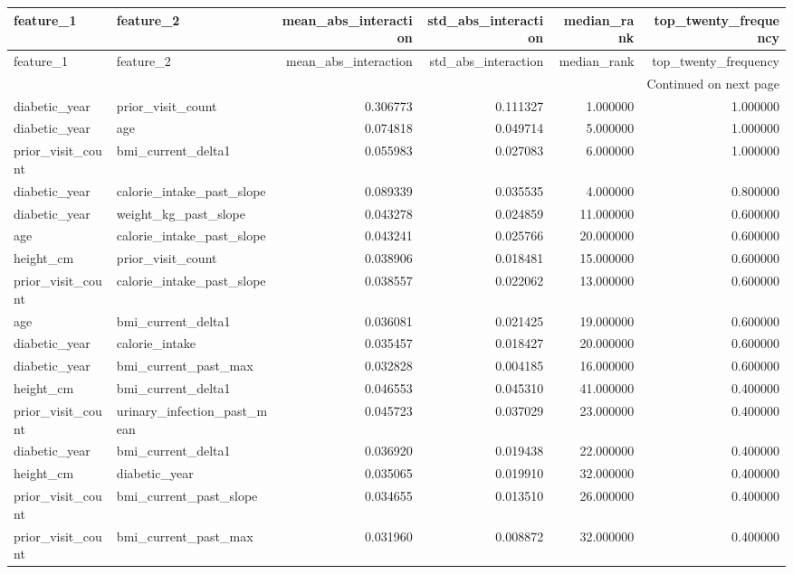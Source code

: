\begin{longtable}{llrrrr}
\toprule
feature\_1 & feature\_2 & mean\_abs\_interaction & std\_abs\_interaction & median\_rank & top\_twenty\_frequency \\
\midrule
\endfirsthead
\toprule
feature\_1 & feature\_2 & mean\_abs\_interaction & std\_abs\_interaction & median\_rank & top\_twenty\_frequency \\
\midrule
\endhead
\midrule
\multicolumn{6}{r}{Continued on next page} \\
\midrule
\endfoot
\bottomrule
\endlastfoot
diabetic\_year & prior\_visit\_count & 0.306773 & 0.111327 & 1.000000 & 1.000000 \\
diabetic\_year & age & 0.074818 & 0.049714 & 5.000000 & 1.000000 \\
prior\_visit\_count & bmi\_current\_delta1 & 0.055983 & 0.027083 & 6.000000 & 1.000000 \\
diabetic\_year & calorie\_intake\_past\_slope & 0.089339 & 0.035535 & 4.000000 & 0.800000 \\
diabetic\_year & weight\_kg\_past\_slope & 0.043278 & 0.024859 & 11.000000 & 0.600000 \\
age & calorie\_intake\_past\_slope & 0.043241 & 0.025766 & 20.000000 & 0.600000 \\
height\_cm & prior\_visit\_count & 0.038906 & 0.018481 & 15.000000 & 0.600000 \\
prior\_visit\_count & calorie\_intake\_past\_slope & 0.038557 & 0.022062 & 13.000000 & 0.600000 \\
age & bmi\_current\_delta1 & 0.036081 & 0.021425 & 19.000000 & 0.600000 \\
diabetic\_year & calorie\_intake & 0.035457 & 0.018427 & 20.000000 & 0.600000 \\
diabetic\_year & bmi\_current\_past\_max & 0.032828 & 0.004185 & 16.000000 & 0.600000 \\
height\_cm & bmi\_current\_delta1 & 0.046553 & 0.045310 & 41.000000 & 0.400000 \\
prior\_visit\_count & urinary\_infection\_past\_mean & 0.045723 & 0.037029 & 23.000000 & 0.400000 \\
diabetic\_year & bmi\_current\_delta1 & 0.036920 & 0.019438 & 22.000000 & 0.400000 \\
height\_cm & diabetic\_year & 0.035065 & 0.019910 & 32.000000 & 0.400000 \\
prior\_visit\_count & bmi\_current\_past\_slope & 0.034655 & 0.013510 & 26.000000 & 0.400000 \\
prior\_visit\_count & bmi\_current\_past\_max & 0.031960 & 0.008872 & 32.000000 & 0.400000 \\

\end{longtable}
